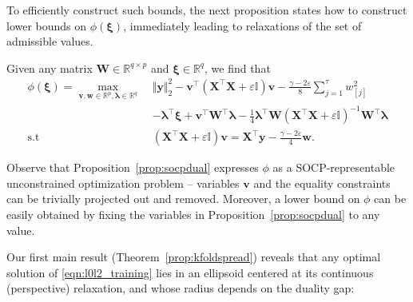 \documentclass[ijoc,noblindrev]{informs3} %
\newcommand{\ag}[1]{{\color{black}#1}}
\begin{document}
 To efficiently construct such bounds, the next proposition states how to construct lower bounds on $\phi(\bm{\xi})$, immediately leading to relaxations of the set of admissible values.

 \begin{proposition}\label{prop:socpdual}
Given any matrix $\bm{W}\in \mathbb{R}^{q\times p}$ and $\bm{\xi}\in \mathbb{R}^q$, we find that 
\begin{align*}
	\phi(\bm{\xi})=\max_{\bm{v}, \bm{w}\in \mathbb{R}^p,\bm{\lambda}\in \mathbb{R}^q}\;& \Vert \bm{y}\Vert_2^2-\bm{v}^\top \left(\bm{X}^\top \bm{X}+\varepsilon\mathbb{I}\right)\bm{v} - \frac{\gamma-2\varepsilon}{8} \sum_{j=1}^\tau w_{[j]}^2 \\
 & -\bm{\lambda}^\top \bm{\xi} + \bm{v}^\top \bm{W}^\top \bm{\lambda}-\frac{1}{4}\bm{\lambda}^\top \bm{W}\left(\bm{X}^\top \bm{X}+\varepsilon\mathbb{I}\right)^{-1}\bm{W}^\top\bm{\lambda}\\
 \text{s.t} \quad & \left(\bm{X}^\top \bm{X}+\varepsilon\mathbb{I}\right) \bm{v}=\bm{X}^\top \bm{y}-\frac{\gamma-2\varepsilon}{4}\bm{w}.
\end{align*}
 \end{proposition}
 Observe that Proposition~\ref{prop:socpdual} expresses $\phi$ as a SOCP-representable unconstrained optimization problem -- variables $\bm{v}$ and the equality constraints can be trivially projected out and removed. Moreover, a lower bound on $\phi$ can be easily obtained by fixing the variables in Proposition~\ref{prop:socpdual} to any value.

\fi

\ag{Our first main result (Theorem~\ref{prop:kfoldspread}) reveals that any optimal solution of \eqref{eqn:l0l2_training} lies in an ellipsoid centered at its continuous (perspective) relaxation, and whose radius depends on the duality gap: %
}
\end{document}
